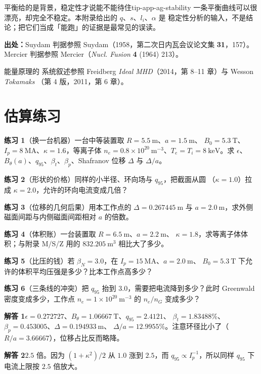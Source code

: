 \begin{tip}{平衡给的是背景，稳定性才说能不能待住}{tip-app-ag-stability}
一条平衡曲线可以很漂亮，却完全不稳定。本附录给出的 $q$、$s$、$l_i$、$\alpha$ 是
稳定性分析的输入，不是结论；把它们当成「能跑」的证据是最常见的误读。
\end{tip}

{\footnotesize
\textbf{出处：}Suydam 判据参照 Suydam（1958，第二次日内瓦会议论文集 \textbf{31}，157）。
Mercier 判据参照 Mercier（\emph{Nucl. Fusion} \textbf{4} (1964) 213）。

能量原理的
系统叙述参照 Freidberg \emph{Ideal MHD}（2014，第 8--11 章）与 Wesson \emph{Tokamaks}
（第 4 版，2011，第 6 章）。
\section{估算练习}
\label{sec:app-ag-problems}
}


\textbf{练习 1}（换一台机器）一台中等装置取 $R=5.5\ \mathrm{m}$、$a=1.5\ \mathrm{m}$、
$B_0=5.3\ \mathrm{T}$、$I_p=8\ \mathrm{MA}$、$\kappa=1.6$，等离子体
$n_e=0.8\times10^{20}\ \mathrm{m^{-3}}$、$T_e=T_i=8\ \mathrm{keV}$。求 $\epsilon$、
$B_\theta(a)$、$q_{95}$、$\beta_t$、$\beta_p$、Shafranov 位移 $\Delta$ 与 $\Delta/a$。

\textbf{练习 2}（形状的价格）同样的小半径、环向场与 $q_{95}$，把截面从圆
（$\kappa=1.0$）拉成 $\kappa=2.0$，允许的环向电流变成几倍？

\textbf{练习 3}（位移的几何后果）用本工作点的 $\Delta=0.267445\ \mathrm{m}$ 与
$a=2.0\ \mathrm{m}$，求外侧磁面间距与内侧磁面间距相对 $a$ 的倍数。

\textbf{练习 4}（体积账）一台装置取 $R=6.5\ \mathrm{m}$、$a=2.2\ \mathrm{m}$、
$\kappa=1.8$，求等离子体体积；与附录 M/S/Z 用的 $832.205\ \mathrm{m^3}$ 相比大了多少。

\textbf{练习 5}（比压的钱）若 $\beta_N=3.0$，在 $I_p=15\ \mathrm{MA}$、$a=2.0\ \mathrm{m}$、
$B_0=5.3\ \mathrm{T}$ 下允许的体积平均压强是多少？比本工作点高多少？

\textbf{练习 6}（三条线的冲突）把 $q_{95}$ 抬到 $3.0$，需要把电流降到多少？此时
Greenwald 密度变成多少，工作点 $n_e=1\times10^{20}\ \mathrm{m^{-3}}$ 的
$n_e/n_G$ 变成多少？

\textbf{解答 1}$\epsilon=0.272727$、$B_\theta=1.06667\ \mathrm{T}$、$q_{95}=2.4121$、
$\beta_t=1.83488\%$、$\beta_p=0.453005$、$\Delta=0.194933\ \mathrm{m}$、
$\Delta/a=12.9955\%$。注意环径比小了（$R/a=3.66667$），位移占比反而略降。

\textbf{解答 2}$2.5$ 倍。因为 $(1+\kappa^2)/2$ 从 $1.0$ 涨到 $2.5$，而 $q_{95}\propto
I_p^{-1}$，所以同样 $q_{95}$ 下电流上限按 $2.5$ 倍放大。

